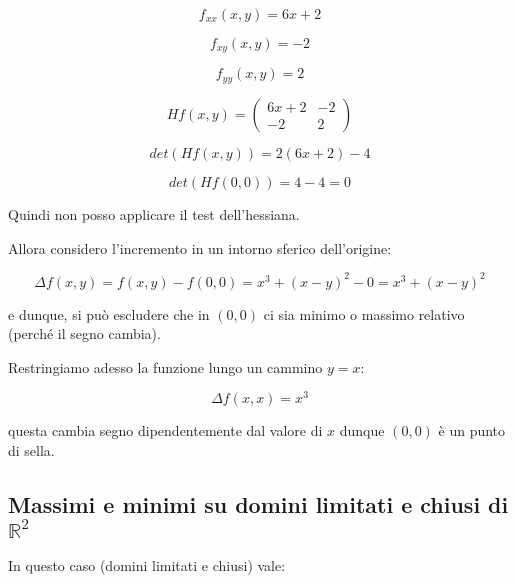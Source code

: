 \documentclass[../appunti-analisi.tex]{subfiles}
\begin{document}
\[
    f_{xx}(x,y) = 6x+2
\]

\[
    f_{xy}(x,y) = -2
\]

\[
    f_{yy}(x,y) = 2
\]

\[
    H f(x,y) = \begin{pmatrix}
        6x+2 & -2\\
        -2 & 2
    \end{pmatrix}
\]

\[
    det(H f(x,y)) = 2(6x+2) -4
\]

\[
    det(H f(0,0)) = 4-4 = 0
\]

Quindi non posso applicare il test dell'hessiana.

Allora considero l'incremento in un intorno sferico dell'origine:

\[
    \Delta f(x,y) = f(x,y) - f(0,0) = x^{3}+(x-y)^{2} -0 = x^{3}+(x-y)^{2}
\]

e dunque, si può escludere che in $(0,0)$ ci sia minimo o massimo relativo (perché il segno cambia).

Restringiamo adesso la funzione lungo un cammino $y=x$:

\[
    \Delta f(x,x) = x^{3}
\]

questa cambia segno dipendentemente dal valore di $x$ dunque $(0,0)$ è un punto di sella.


\subsection{Massimi e minimi su domini limitati e chiusi di $\mathbb{R}^{2}$}

In questo caso (domini limitati e chiusi) vale:

\end{document}
